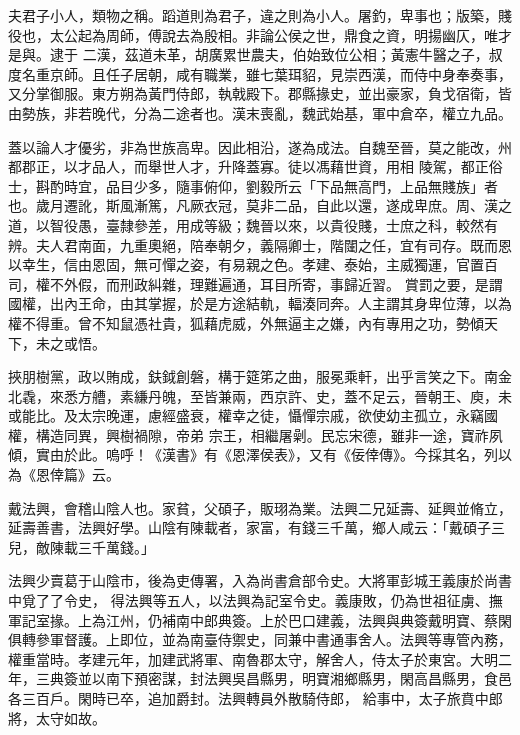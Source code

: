 
\begin{pinyinscope}

 夫君子小人，類物之稱。蹈道則為君子，違之則為小人。屠釣，卑事也；版築，賤役也，太公起為周師，傅說去為殷相。非論公侯之世，鼎食之資，明揚幽仄，唯才是與。逮于
 二漢，茲道未革，胡廣累世農夫，伯始致位公相；黃憲牛醫之子，叔度名重京師。且任子居朝，咸有職業，雖七葉珥貂，見崇西漢，而侍中身奉奏事，又分掌御服。東方朔為黃門侍郎，執戟殿下。郡縣掾史，並出豪家，負戈宿衛，皆由勢族，非若晚代，分為二途者也。漢末喪亂，魏武始基，軍中倉卒，權立九品。



 蓋以論人才優劣，非為世族高卑。因此相沿，遂為成法。自魏至晉，莫之能改，州都郡正，以才品人，而舉世人才，升降蓋寡。徒以馮藉世資，用相
 陵駕，都正俗士，斟酌時宜，品目少多，隨事俯仰，劉毅所云「下品無高門，上品無賤族」者也。歲月遷訛，斯風漸篤，凡厥衣冠，莫非二品，自此以還，遂成卑庶。周、漢之道，以智役愚，臺隸參差，用成等級；魏晉以來，以貴役賤，士庶之科，較然有辨。夫人君南面，九重奧絕，陪奉朝夕，義隔卿士，階闥之任，宜有司存。既而恩以幸生，信由恩固，無可憚之姿，有易親之色。孝建、泰始，主威獨運，官置百司，權不外假，而刑政糾雜，理難遍通，耳目所寄，事歸近習。
 賞罰之要，是謂國權，出內王命，由其掌握，於是方途結軌，輻湊同奔。人主謂其身卑位薄，以為權不得重。曾不知鼠憑社貴，狐藉虎威，外無逼主之嫌，內有專用之功，勢傾天下，未之或悟。



 挾朋樹黨，政以賄成，鈇鉞創磐，構于筵笫之曲，服冕乘軒，出乎言笑之下。南金北毳，來悉方艚，素縑丹魄，至皆兼兩，西京許、史，蓋不足云，晉朝王、庾，未或能比。及太宗晚運，慮經盛衰，權幸之徒，懾憚宗戚，欲使幼主孤立，永竊國權，構造同異，興樹禍隙，帝弟
 宗王，相繼屠劋。民忘宋德，雖非一途，寶祚夙傾，實由於此。嗚呼！《漢書》有《恩澤侯表》，又有《佞倖傳》。今採其名，列以為《恩倖篇》云。



 戴法興，會稽山陰人也。家貧，父碩子，販珝為業。法興二兄延壽、延興並脩立，延壽善書，法興好學。山陰有陳載者，家富，有錢三千萬，鄉人咸云：「戴碩子三兒，敵陳載三千萬錢。」



 法興少賣葛于山陰市，後為吏傳署，入為尚書倉部令史。大將軍彭城王義康於尚書中覓了了令史，
 得法興等五人，以法興為記室令史。義康敗，仍為世祖征虜、撫軍記室掾。上為江州，仍補南中郎典簽。上於巴口建義，法興與典簽戴明寶、蔡閑俱轉參軍督護。上即位，並為南臺侍禦史，同兼中書通事舍人。法興等專管內務，權重當時。孝建元年，加建武將軍、南魯郡太守，解舍人，侍太子於東宮。大明二年，三典簽並以南下預密謀，封法興吳昌縣男，明寶湘鄉縣男，閑高昌縣男，食邑各三百戶。閑時已卒，追加爵封。法興轉員外散騎侍郎，
 給事中，太子旅賁中郎將，太守如故。




\end{pinyinscope}
